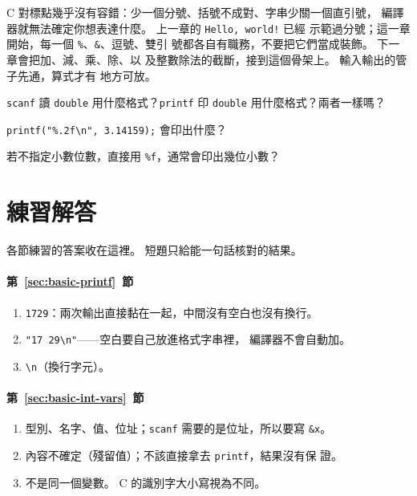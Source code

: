 
C 對標點幾乎沒有容錯：少一個分號、括號不成對、字串少關一個直引號，
編譯器就無法確定你想表達什麼。 上一章的 \texttt{Hello, world!} 已經
示範過分號；這一章開始，每一個 \texttt{\%}、\texttt{\&}、逗號、雙引
號都各自有職務，不要把它們當成裝飾。 下一章會把加、減、乘、除、以
及整數除法的截斷，接到這個骨架上。 輸入輸出的管子先通，算式才有
地方可放。

\begin{drills}[label=drills:basic-double]
\item \texttt{scanf} 讀 \texttt{double} 用什麼格式？\texttt{printf}
印 \texttt{double} 用什麼格式？兩者一樣嗎？
\item \texttt{printf("\%.2f\textbackslash n", 3.14159);} 會印出什麼？
\item 若不指定小數位數，直接用 \texttt{\%f}，通常會印出幾位小數？
\end{drills}

\section*{練習解答}

各節練習的答案收在這裡。 短題只給能一句話核對的結果。

\paragraph{第~\ref{sec:basic-printf}~節}
\begin{enumerate}
\item \texttt{1729}：兩次輸出直接黏在一起，中間沒有空白也沒有換行。
\item \texttt{"17 29\textbackslash n"}——空白要自己放進格式字串裡，
編譯器不會自動加。
\item \texttt{\textbackslash n}（換行字元）。
\end{enumerate}

\paragraph{第~\ref{sec:basic-int-vars}~節}
\begin{enumerate}
\item 型別、名字、值、位址；\texttt{scanf} 需要的是位址，所以要寫
\texttt{\&x}。
\item 內容不確定（殘留值）；不該直接拿去 \texttt{printf}，結果沒有保
證。
\item 不是同一個變數。 C 的識別字大小寫視為不同。
\end{enumerate}

